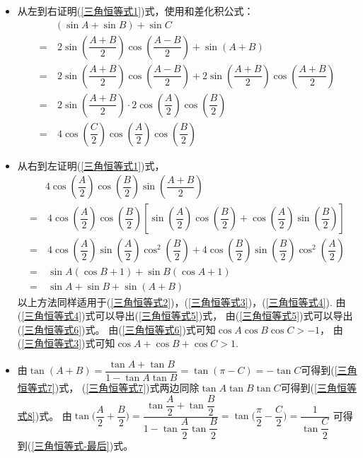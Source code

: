 \begin{itemize}[leftmargin=\inteval{\myitemleftmargin}pt,itemsep=
   \inteval{\myitemitempsep}pt,topsep=\inteval{\myitemtopsep}pt]
\item 从左到右证明(\ref{三角恒等式1})式，使用和差化积公式：
\begin{align*}
    & (\sin A +\sin B) +\sin C  \\
    =&\  2\sin\left(\dfrac{A+B}{2}\right)\cos\left(\dfrac{A-B}{2}\right)+\sin(A+B) \\    
    =&\  2\sin\left(\dfrac{A+B}{2}\right)\cos\left(\dfrac{A-B}{2}\right)+
    2\sin\left(\dfrac{A+B}{2}\right)\cos\left(\dfrac{A+B}{2}\right) \\
    =&\  2\sin\left(\dfrac{A+B}{2}\right)\cdot 2\cos\left(\dfrac{A}{2}\right)\cos\left(\dfrac{B}{2}\right) \\
    =&\  4\cos\left(\dfrac{C}{2}\right)\cos\left(\dfrac{A}{2}\right)\cos\left(\dfrac{B}{2}\right)
\end{align*}
\item 从右到左证明(\ref{三角恒等式1})式，
\begin{align*}
    & 4\cos\left(\dfrac{A}{2}\right)\cos\left(\dfrac{B}{2}\right)\sin\left(\dfrac{A+B}{2}\right) \\
    =&\  4\cos\left(\dfrac{A}{2}\right)\cos\left(\dfrac{B}{2}\right) \left[\sin\left(\dfrac{A}{2}\right) \cos\left(\dfrac{B}{2}\right)+\cos\left(\dfrac{A}{2}\right) \sin\left(\dfrac{B}{2}\right) \right] \\
    =&\  4\cos\left(\dfrac{A}{2}\right)\sin\left(\dfrac{A}{2}\right)\cos^2\left(\dfrac{B}{2}\right)+
    4\cos\left(\dfrac{B}{2}\right)\sin\left(\dfrac{B}{2}\right)\cos^2\left(\dfrac{A}{2}\right)\\
    =&\  \sin A (\cos B+1)+\sin B(\cos A +1) \\
    =&\  \sin A +\sin B + \sin(A+B)
\end{align*}
以上方法同样适用于(\ref{三角恒等式2})，(\ref{三角恒等式3})，(\ref{三角恒等式4}).
由(\ref{三角恒等式4})式可以导出(\ref{三角恒等式5})式，
由(\ref{三角恒等式5})式可以导出(\ref{三角恒等式6})式。
由(\ref{三角恒等式6})式可知$ \cos A\cos B\cos C >-1 $，
由(\ref{三角恒等式3})式可知$ \cos A+\cos B+\cos C >1 $.  

\item 由$ \tan(A+B)=\dfrac{\tan A+\tan B}{1-\tan A\tan B}=
\tan(\pi-C)=-\tan C $可得到(\ref{三角恒等式7})式，
(\ref{三角恒等式7})式两边同除$ \tan A \tan B\tan C $可得到(\ref{三角恒等式8})式。
由$ \tan\Big(\dfrac{A}{2}+\dfrac{B}{2}\Big)=\dfrac{\tan \dfrac{A}{2}+
    \tan \dfrac{B}{2}}{1-\tan \dfrac{A}{2}\tan \dfrac{B}{2}}
=\tan\Big(\dfrac{\pi}{2}-\dfrac{C}{2}\Big)=\dfrac{1}{\tan \dfrac{C}{2}} $
可得到(\ref{三角恒等式-最后})式。


\end{itemize}
